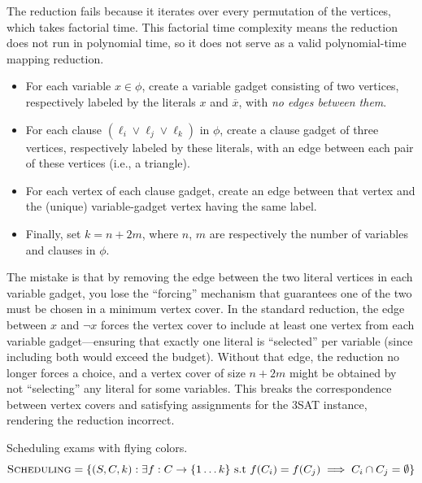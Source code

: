 \documentclass[12pt, letterpaper]{article}
\begin{document}
\begin{problemproof}
    The reduction fails because it iterates over every permutation of the vertices, which takes factorial time. This factorial time complexity means the reduction does not run in polynomial time, so it does not serve as a valid polynomial-time mapping reduction.
\end{problemproof}

\begin{subproblem}{}
    \begin{itemize}
        \item For each variable $x \in \phi$, create a variable gadget
         consisting of two vertices, respectively labeled by the literals $x$ and $\overline x$, with \emph{no edges between them}. 
         \item For each clause $(\ell_i \lor \ell_j \lor \ell_k)$ in $\phi$, create a clause gadget of three vertices, respectively labeled by these literals, with an edge between each pair of these vertices (i.e., a triangle).
         \item For each vertex of each clause gadget, create an edge between that vertex and the (unique) variable-gadget vertex having the same label. 
         \item Finally, set $k = n+2m$, where $n$, $m$ are respectively the number of variables and clauses in $\phi$. 
    \end{itemize}
\end{subproblem}
\begin{problemproof}
    The mistake is that by removing the edge between the two literal vertices in each variable gadget, you lose the “forcing” mechanism that guarantees one of the two must be chosen in a minimum vertex cover. In the standard reduction, the edge between \(x\) and \(\neg x\) forces the vertex cover to include at least one vertex from each variable gadget—ensuring that exactly one literal is “selected” per variable (since including both would exceed the budget). Without that edge, the reduction no longer forces a choice, and a vertex cover of size \(n + 2m\) might be obtained by not “selecting” any literal for some variables. This breaks the correspondence between vertex covers and satisfying assignments for the \textsc{3SAT} instance, rendering the reduction incorrect.
\end{problemproof}
\newcommand{\Coloring}
{\textsc{Coloring}}
\newcommand{\Schedule}{\textsc{Scheduling}}
\begin{problem}{Scheduling exams with flying colors.}
    \vspace{-20pt}
    \[\Schedule = \set{(S, C, k): \exists f: C \rightarrow \{1 \ldots k\} \text{ s.t } f(C_i) = f(C_j) \implies C_i \cap C_j = \emptyset}\]
\end{problem}
\end{document}
